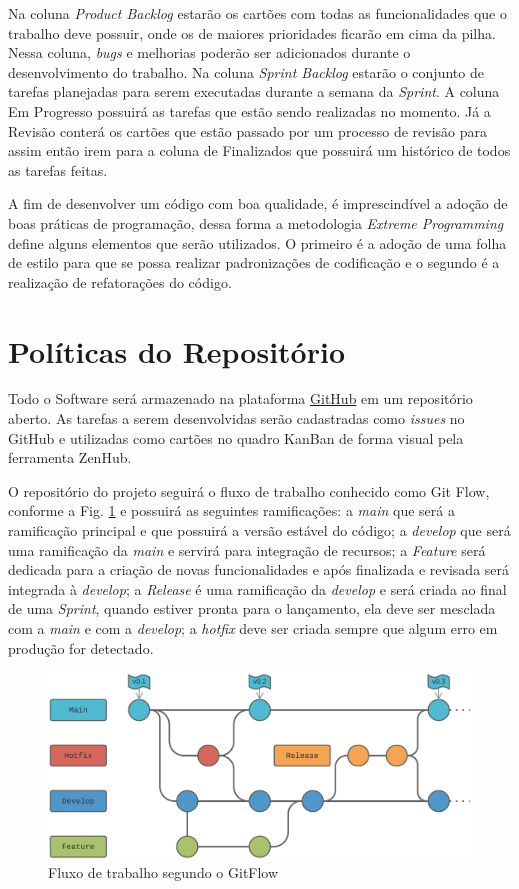 Na coluna \textit{Product Backlog} estarão os cartões com todas as funcionalidades que o trabalho deve possuir, onde os de maiores prioridades ficarão em cima da pilha. Nessa coluna, \textit{bugs} e melhorias poderão ser adicionados durante o desenvolvimento do trabalho. Na coluna \textit{Sprint Backlog} estarão o conjunto de tarefas planejadas para serem executadas durante a semana da \textit{Sprint}. A coluna Em Progresso possuirá as tarefas que estão sendo realizadas no momento. Já a Revisão conterá os cartões que estão passado por um processo de revisão para assim então irem para a coluna de Finalizados que possuirá um histórico de todos as tarefas feitas.

A fim de desenvolver um código com boa qualidade, é imprescindível a adoção de boas práticas de programação, dessa forma a metodologia \textit{Extreme Programming} define alguns elementos que serão utilizados. O primeiro é a adoção de uma folha de estilo para que se possa realizar padronizações de codificação e o segundo é a realização de refatorações do código.

\section{Políticas do Repositório}

Todo o Software será armazenado na plataforma \href{https://github.com/}{GitHub} em um repositório aberto. As tarefas a serem desenvolvidas serão cadastradas como \textit{issues} no GitHub e utilizadas como cartões no quadro KanBan de forma visual pela ferramenta ZenHub.

O repositório do projeto seguirá o fluxo de trabalho conhecido como Git Flow, conforme a Fig. \ref{gitflow} e possuirá as seguintes ramificações: a \textit{main} que será a ramificação principal e que possuirá a versão estável do código; a \textit{develop} que será uma ramificação da \textit{main} e servirá para integração de recursos; a \textit{Feature} será dedicada para a criação de novas funcionalidades e após finalizada e revisada será integrada à \textit{develop}; a \textit{Release} é uma ramificação da \textit{develop} e será criada ao final de uma \textit{Sprint}, quando estiver pronta para o lançamento, ela deve ser mesclada com a \textit{main} e com a \textit{develop}; a \textit{hotfix} deve ser criada sempre que algum erro em produção for detectado.  

\begin{figure}[h]
	\centering
	\includegraphics[keepaspectratio=true,scale=0.18]{figuras/git flow.png}
	\caption{Fluxo de trabalho segundo o GitFlow}
	\label{gitflow}
\end{figure}


